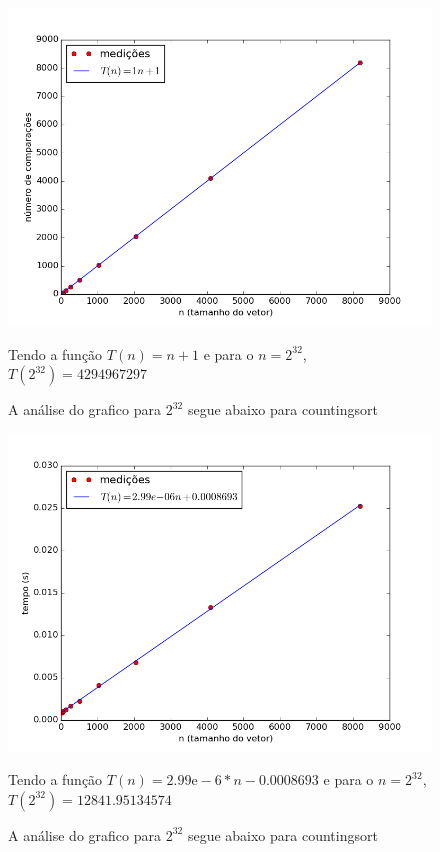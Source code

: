 \documentclass[12pt,a4paper,twoside]{report}
\begin{document}
\begin{figure}[ht]
\centering \includegraphics[scale=0.8]{../countingsort/imagens/countingsortAleatorio1.png}
\caption{A análise do grafico para $2^{32}$ segue abaixo para countingsort}

Tendo a função $T(n) = n+1 $ e para o $n =2^{32}$, $T(2^{32}) = 4294967297$ 
\label{fig:countingsortAleatorio1}
\end{figure}




\begin{figure}[ht]
\centering \includegraphics[scale=0.8]{../countingsort/imagens/countingsortCrescente0.png}
\caption{A análise do grafico para $2^{32}$ segue abaixo para countingsort}

Tendo a função $T(n) = 2.99\mathrm{e}-6*n-0.0008693$ e para o $n =2^{32}$, $T(2^{32}) = 12841.95134574$ 
\label{fig:countingsortCrescente0}
\end{figure}
\end{document}
